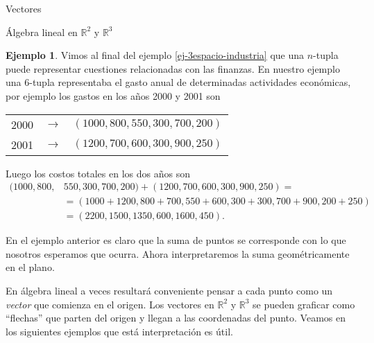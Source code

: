 \documentclass[a4paper,12pt,twoside,spanish,reqno]{amsbook}
\theoremstyle{definition}
\newtheorem{ejemplo}{Ejemplo}[section]
\theoremstyle{remark}
\newcommand{\R}{\mathbb R}
\begin{document}
\begin{chapter}{Vectores}
\begin{section}{Álgebra lineal en $\R^2$ y $\R^3$}
    \begin{ejemplo} 
        Vimos al final del ejemplo  \ref{ej-3espacio-industria} que una $n$-tupla puede representar cuestiones relacionadas con las finanzas. En  nuestro ejemplo una 6-tupla representaba el gasto anual de determinadas actividades económicas, por ejemplo los gastos  en los años 2000 y 2001 son 
        \begin{center}
            \begin{tabular}{lcl}
                2000 \quad&$\rightarrow$\quad &$(1000, 800, 550, 300, 700, 200)$ \\
                2001 \quad&$\rightarrow$\quad &$(1200, 700, 600, 300, 900, 250)$ 
            \end{tabular} 
        \end{center}
        Luego los costos totales en los dos años son 
        \begin{align*}
            (1000, 800,& 550, 300, 700, 200) + (1200, 700, 600, 300, 900, 250) = \\
            &=(1000+1200, 800+700, 550+600, 300+300, 700+900, 200+250) \\
            &= (2200, 1500, 1350, 600, 1600, 450). 
        \end{align*} 
    \end{ejemplo}
    
    
    En  el ejemplo anterior es claro que la suma de puntos se corresponde con lo que nosotros esperamos que ocurra. Ahora interpretaremos la suma  geométricamente en el plano.
    
    En  álgebra lineal a veces resultará  conveniente pensar a cada punto como un {\em vector} que comienza en el origen.  Los vectores en  $\R^2$ y $\R^3$ se pueden graficar como ``flechas'' que parten del origen y llegan a las coordenadas del punto. Veamos en los siguientes ejemplos que está interpretación es útil. 
    

\end{section}
\end{chapter}
\end{document}
